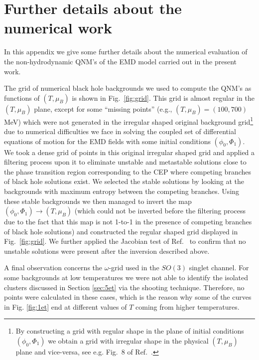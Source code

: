 \documentclass[aps,prd,showkeys,superscriptaddress,singlecolumn,nofootinbib,floatfix]{revtex4-1}
\begin{document}
\appendix
\section{Further details about the numerical work}
\label{sec:num}

In this appendix we give some further details about the numerical evaluation of the non-hydrodynamic QNM's of the EMD model carried out in the present work.

The grid of numerical black hole backgrounds we used to compute the QNM's as functions of $(T,\mu_B)$ is shown in Fig.\ \ref{fig:grid}. This grid is almost regular in the $(T,\mu_B)$ plane, except for some ``missing points'' (e.g., $(T,\mu_B)=(100,700)$ MeV) which were not generated in the irregular shaped original background grid\footnote{By constructing a grid with regular shape in the plane of initial conditions $(\phi_0,\Phi_1)$ we obtain a grid with irregular shape in the physical $(T,\mu_B)$ plane and vice-versa, see e.g. Fig.\ 8 of Ref.\ \cite{Critelli:2017oub}.} \cite{Critelli:2017oub} due to numerical difficulties we face in solving the coupled set of differential equations of motion for the EMD fields with some initial conditions $(\phi_0,\Phi_1)$. We took a dense grid of points in this original irregular shaped grid and applied a filtering process upon it to eliminate unstable and metastable solutions close to the phase transition region corresponding to the CEP where competing branches of black hole solutions exist. We selected the stable solutions by looking at the backgrounds with maximum entropy between the competing branches. Using these stable backgrounds we then managed to invert the map $(\phi_0,\Phi_1)\to(T,\mu_B)$ (which could not be inverted before the filtering process due to the fact that this map is not 1-to-1 in the presence of competing branches of black hole solutions) and constructed the regular shaped grid displayed in Fig.\ \ref{fig:grid}. We further applied the Jacobian test of Ref.\ \cite{DeWolfe:2010he} to confirm that no unstable solutions were present after the inversion described above.

A final observation concerns the $\omega$-grid used in the $SO(3)$ singlet channel. For some backgrounds at low temperatures we were not able to identify the isolated clusters discussed in Section \ref{sec:5et} via the shooting technique. Therefore, no points were calculated in these cases, which is the reason why some of the curves in Fig. \ref{fig:1et} end at different values of $T$ coming from higher temperatures.





\end{document}

